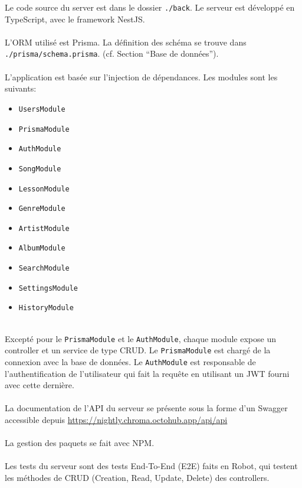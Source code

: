 Le code source du server est dans le dossier \texttt{./back}. Le serveur est développé en TypeScript, avec le framework NestJS.
\\\\
L’ORM utilisé est Prisma. La définition des schéma se trouve dans \texttt{./prisma/schema.prisma}. (cf. Section “Base de données”).
\\\\
L’application est basée sur l'injection de dépendances. Les modules sont les suivants:

\begin{itemize}
	\item \texttt{UsersModule}
	\item \texttt{PrismaModule}
	\item \texttt{AuthModule}
	\item \texttt{SongModule}
	\item \texttt{LessonModule}
	\item \texttt{GenreModule}
	\item \texttt{ArtistModule}
	\item \texttt{AlbumModule}
	\item \texttt{SearchModule}
	\item \texttt{SettingsModule}
	\item \texttt{HistoryModule}
\end{itemize}
\  \\ %
Excepté pour le \texttt{PrismaModule} et le \texttt{AuthModule}, chaque module expose un controller et un service de type CRUD.
Le \texttt{PrismaModule} est chargé de la connexion avec la base de données. Le \texttt{AuthModule} est responsable de l'authentification de l’utilisateur qui fait la requête en utilisant un JWT fourni avec cette dernière.
\\\\
La documentation de l’API du serveur se présente sous la forme d’un Swagger accessible depuis \url{https://nightly.chroma.octohub.app/api/api}
\\\\
La gestion des paquets se fait avec NPM.
\\\\
Les tests du serveur sont des tests End-To-End (E2E) faits en Robot, qui testent les méthodes de CRUD (Creation, Read, Update, Delete) des controllers. 
